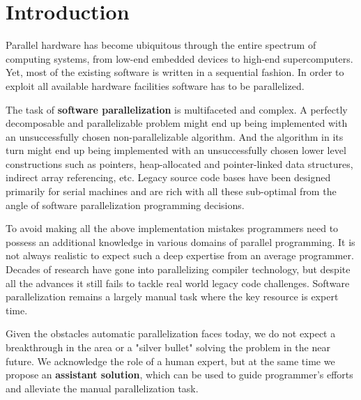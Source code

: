 \chapter{Introduction}


\quad Parallel hardware has become ubiquitous through the entire spectrum of computing systems, from low-end embedded devices to high-end supercomputers. Yet, most of the existing software is written in a sequential fashion. In order to exploit all available hardware facilities software has to be parallelized.


\quad The task of \textbf{software parallelization} is multifaceted and complex. A perfectly decomposable and parallelizable problem might end up being implemented with an unsuccessfully chosen non-parallelizable algorithm. And the algorithm in its turn might end up being implemented with an unsuccessfully chosen lower level constructions such as pointers, heap-allocated and pointer-linked data structures, indirect array referencing, etc. Legacy source code bases have been designed primarily for serial machines and are rich with all these sub-optimal from the angle of software parallelization programming decisions.


\quad To avoid making all the above implementation mistakes programmers need to possess an additional knowledge in various domains of parallel programming. It is not always realistic to expect such a deep expertise from an average programmer. Decades of research have gone into parallelizing compiler technology, but despite all the advances it still fails to tackle real world legacy code challenges. Software parallelization remains a largely manual task where the key resource is expert time.


\quad Given the obstacles automatic parallelization faces today, we do not expect a breakthrough in the area or a "silver bullet" solving the problem in the near future. We acknowledge the role of a human expert, but at the same time we propose an \textbf{assistant solution}, which can be used to guide programmer's efforts and alleviate the manual parallelization task.



